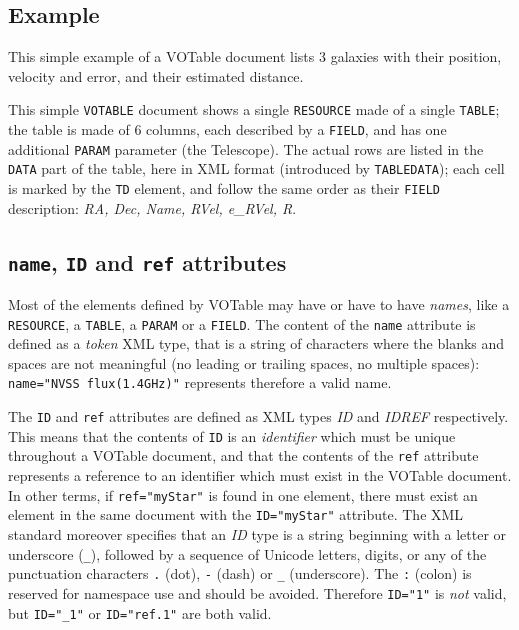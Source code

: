 \documentclass[11pt,a4paper]{ivoa}
\let\fg=\color
\def\attr#1{{\tt{\fg{DarkRed}#1}}}
\def\elem#1{{\tt{\fg{DarkRed}#1}}}
\def\attrval#1#2{{\tt{\fg{DarkRed}#1}="{\fg{DarkPurple}#2}"}}
\begin{document}
\subsection{Example}

This simple example of a VOTable document lists 3 galaxies with their
position, velocity and error, and their estimated distance.

\label{example1}
\begingroup\small

\endgroup

This simple \elem{VOTABLE} document shows a single \elem{RESOURCE} made of a single \elem{TABLE};
the table is made of 6 columns, each described by a \elem{FIELD}, and has
one additional \elem{PARAM} parameter (the Telescope). The actual rows are
listed in the \elem{DATA} part of the table, here in  XML format
(introduced by \elem{TABLEDATA}); each cell is marked by the \elem{TD} element,
and follow the same order as their \elem{FIELD} description:
{\sl RA, Dec, Name, RVel, e\_RVel, R}.


\subsection{{\attr{name}, \attr{ID} and \attr{ref} attributes}}
\label{sec:name}

Most of the elements defined by VOTable may have or have to have {\em names},
like a \elem{RESOURCE}, a \elem{TABLE}, a \elem{PARAM} or a \elem{FIELD}.
The content of the \attr{name} attribute is defined as a {\em token}
XML type,
that is a string of characters where the blanks and spaces are not
meaningful (no leading or trailing spaces, no multiple spaces):
\attrval{name}{NVSS flux(1.4GHz)} represents therefore
a valid name.

The \attr{ID} and \attr{ref} attributes are defined as XML types {\em ID}
and {\em IDREF} respectively. This means that the contents of \attr{ID}
is an {\em identifier} which must be {unique} throughout a VOTable document,
and that the contents of the \attr{ref} attribute represents a reference to
an identifier which must exist in the VOTable document.
In other terms, if \attrval{ref}{myStar} is found in one element,
there must exist an element in the same document with the
\attrval{ID}{myStar} attribute. The XML standard moreover specifies
that an {\em ID} type is a string beginning with a letter or
underscore ({\tt{\_}}),
followed by a sequence of Unicode letters, digits, or any of the
punctuation characters {\tt.} (dot), {\tt-} (dash) or {\tt\_} (underscore).
The {\tt:} (colon) is reserved for namespace use and should be avoided.
Therefore \attrval{ID}{1} is {\em not} valid,
but \attrval{ID}{\_1} or \attrval{ID}{ref.1} are both valid.
\end{document}
